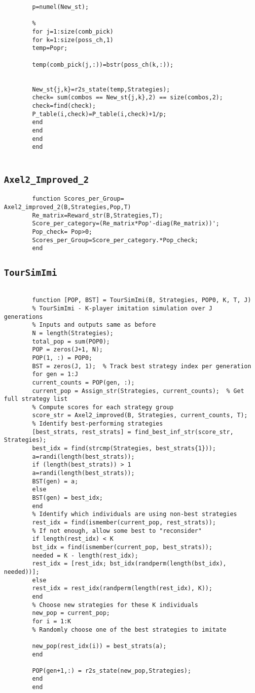 \begin{appendices}
\begin{lstlisting}
		p=numel(New_st);
		
		%
		for j=1:size(comb_pick)
		for k=1:size(poss_ch,1)
		temp=Popr;
		
		temp(comb_pick(j,:))=bstr(poss_ch(k,:));
		
		
		New_st{j,k}=r2s_state(temp,Strategies);
		check= sum(combos == New_st{j,k},2) == size(combos,2);
		check=find(check);
		P_table(i,check)=P_table(i,check)+1/p;
		end
		end
		end
		end
		
	\end{lstlisting}
	
	\subsection*{\texttt{Axel2\_Improved\_2}}
	\label{appendix:Axel2Imp2}
	\begin{lstlisting}
		function Scores_per_Group= Axel2_improved_2(B,Strategies,Pop,T)
		Re_matrix=Reward_str(B,Strategies,T);
		Score_per_category=(Re_matrix*Pop'-diag(Re_matrix))';
		Pop_check= Pop>0;
		Scores_per_Group=Score_per_category.*Pop_check;
		end \end{lstlisting}
	
	\subsection*{\texttt{TourSimImi}}
	\label{appendix:TourSimImi}
	\begin{lstlisting}
		
		function [POP, BST] = TourSimImi(B, Strategies, POP0, K, T, J)
		% TourSimImi - K-player imitation simulation over J generations
		% Inputs and outputs same as before
		N = length(Strategies);
		total_pop = sum(POP0);
		POP = zeros(J+1, N);
		POP(1, :) = POP0;
		BST = zeros(J, 1);  % Track best strategy index per generation
		for gen = 1:J
		current_counts = POP(gen, :);
		current_pop = Assign_str(Strategies, current_counts);  % Get full strategy list
		% Compute scores for each strategy group
		score_str = Axel2_improved(B, Strategies, current_counts, T);
		% Identify best-performing strategies
		[best_strats, rest_strats] = find_best_inf_str(score_str, Strategies);
		best_idx = find(strcmp(Strategies, best_strats{1}));
		a=randi(length(best_strats));
		if (length(best_strats)) > 1
		a=randi(length(best_strats));
		BST(gen) = a;
		else
		BST(gen) = best_idx;
		end
		% Identify which individuals are using non-best strategies
		rest_idx = find(ismember(current_pop, rest_strats));
		% If not enough, allow some best to "reconsider"
		if length(rest_idx) < K
		bst_idx = find(ismember(current_pop, best_strats));
		needed = K - length(rest_idx);
		rest_idx = [rest_idx; bst_idx(randperm(length(bst_idx), needed))];
		else
		rest_idx = rest_idx(randperm(length(rest_idx), K));
		end
		% Choose new strategies for these K individuals
		new_pop = current_pop;
		for i = 1:K
		% Randomly choose one of the best strategies to imitate
		
		new_pop(rest_idx(i)) = best_strats(a);
		end
		
		POP(gen+1,:) = r2s_state(new_pop,Strategies);
		end
		end
		
	\end{lstlisting}
\end{appendices}
